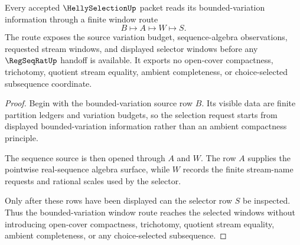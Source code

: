 \begin{theorem}\label{thm:helly-selection-bounded-variation-window}
Every accepted $\HellySelectionUp$ packet reads its bounded-variation information through a finite window route
$$
B \longmapsto A \longmapsto W \longmapsto S.
$$
The route exposes the source variation budget, sequence-algebra observations, requested stream windows, and displayed selector windows before any $\RegSeqRatUp$ handoff is available. It exports no open-cover compactness, trichotomy, quotient stream equality, ambient completeness, or choice-selected subsequence coordinate.
\end{theorem}
\begin{proof}
Begin with the bounded-variation source row $B$. Its visible data are finite partition ledgers and variation budgets, so the selection request starts from displayed bounded-variation information rather than an ambient compactness principle.

The sequence source is then opened through $A$ and $W$. The row $A$ supplies the pointwise real-sequence algebra surface, while $W$ records the finite stream-name requests and rational scales used by the selector.

Only after these rows have been displayed can the selector row $S$ be inspected. Thus the bounded-variation window route reaches the selected windows without introducing open-cover compactness, trichotomy, quotient stream equality, ambient completeness, or any choice-selected subsequence.
\end{proof}

